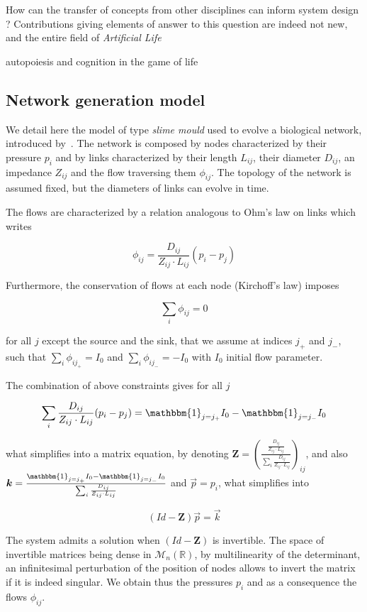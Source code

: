 \documentclass[runningheads,a4paper]{llncs2e/llncs}
\begin{document}
How can the transfer of concepts from other disciplines can inform system design ? Contributions giving elements of answer to this question are indeed not new, and the entire field of \emph{Artificial Life} 



\cite{beer2004autopoiesis} autopoiesis and cognition in the game of life


\subsection{Network generation model}


We detail here the model of type \emph{slime mould} used to evolve a biological network, introduced by~\cite{tero2007mathematical}. The network is composed by nodes characterized by their pressure $p_i$ and by links characterized by their length $L_{ij}$, their diameter $D_{ij}$, an impedance $Z_{ij}$ and the flow traversing them $\phi_{ij}$. The topology of the network is assumed fixed, but the diameters of links can evolve in time.


The flows are characterized by a relation analogous to Ohm's law on links which writes

\[
\phi_{ij} = \frac{D_{ij}}{Z_{ij}\cdot L_{ij}} \left(p_i - p_j\right)
\]

Furthermore, the conservation of flows at each node (Kirchoff's law) imposes

\[
\sum_i \phi_{ij} = 0
\]

for all $j$ except the source and the sink, that we assume at indices $j_+$ and $j_-$, such that $\sum_i \phi_{ij_+} = I_0$ and $\sum_i \phi_{ij_-} = -I_0$ with $I_0$ initial flow parameter.

The combination of above constraints gives for all $j$

\[
\sum_i \frac{D_{ij}}{Z_{ij}\cdot L_{ij}} (p_i - p_j) = \mathbbm{1}_{j=j_+} I_0 - \mathbbm{1}_{j=j_-} I_0 
\]

what simplifies into a matrix equation, by denoting $\mathbf{Z} = \left(\frac{\frac{D_{ij}}{Z_{ij}\cdot L_{ij}}}{\sum_i \frac{D_{ij}}{Z_{ij}\cdot L_{ij}}}\right)_{ij}$, and also $\vec{k} = \frac{\mathbbm{1}_{j=j_+} I_0 - \mathbbm{1}_{j=j_-} I_0 }{\sum_i \frac{D_{ij}}{Z_{ij}\cdot L_{ij}}}$ and $\vec{p} = p_i$, what simplifies into

\[
\left(Id - \mathbf{Z}\right) \vec{p} = \vec{k}
\]

The system admits a solution when $\left(Id - \mathbf{Z}\right)$ is invertible. The space of invertible matrices being dense in $\mathcal{M}_n(\mathbb{R})$, by multilinearity of the determinant, an infinitesimal perturbation of the position of nodes allows to invert the matrix if it is indeed singular. We obtain thus the pressures $p_i$ and as a consequence the flows $\phi_{ij}$.
\end{document}
